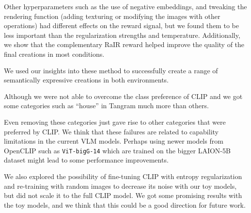 Other hyperparameters such as the use of negative embeddings, and tweaking the rendering function (adding texturing or modifying the images with other operations) had different effects on the reward signal, but we found them to be less important than the regularization strengths and temperature.
Additionally, we show that the complementary RaIR reward helped improve the quality of the final creations in most conditions.

We used our insights into these method to successfully create a range of semantically expressive creations in both environments.




Although we were not able to overcome the class preference of CLIP and we got some categories such as ``house'' in Tangram much more than others.


Even removing these categories just gave rise to other categories that were preferred by CLIP.
We think that these failures are related to capability limitations in the current VLM models.
Perhaps using newer models from OpenCLIP such as \texttt{ViT-bigG-14} \citep{openclip} which are trained on the bigger LAION-5B dataset \citep{laion5b} might lead to some performance improvements.

We also explored the possibility of fine-tuning CLIP with entropy regularization and re-training with random images to decrease its noise with our toy models, but did not scale it to the full CLIP model.
We got some promising results with the toy models, and we think that this could be a good direction for future work.

